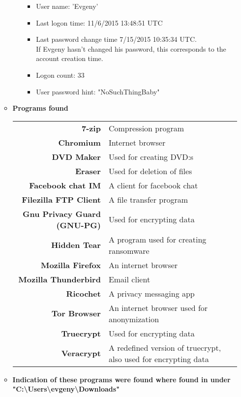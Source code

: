 \begin{enumerate}
\begin{itemize}
\begin{itemize}
		\begin{itemize}
			\item User name: 'Evgeny'
			\item Last logon time: 11/6/2015 13:48:51 UTC
			\item Last password change time 7/15/2015 10:35:34 UTC.\\
			If Evgeny hasn't changed his password, this corresponds to the account creation time.
			\item Logon count: 33
			\item User password hint: "NoSuchThingBaby"
		\end{itemize}
\end{itemize}
	
	
	\newpage
	\item \textbf{Programs found}
	
	\begin{tabular}{|r|l|}
		\hline
		\textbf{7-zip} & Compression program \\
		\textbf{Chromium} & Internet browser \\
		\textbf{DVD Maker} & Used for creating DVD:s \\
		\textbf{Eraser} & Used for deletion of files \\
		\textbf{Facebook chat IM} & A client for facebook chat \\
		\textbf{Filezilla FTP Client} & A file transfer program \\
		\textbf{Gnu Privacy Guard (GNU-PG)} & Used for encrypting data \\
		\textbf{Hidden Tear} & A program used for creating ransomware \\
		\textbf{Mozilla Firefox} & An internet browser \\
		\textbf{Mozilla Thunderbird} & Email client \\
		\textbf{Ricochet} & A privacy messaging app \\
		\textbf{Tor Browser} & An internet browser used for anonymization \\
		\textbf{Truecrypt} & Used for encrypting data \\
		\textbf{Veracrypt} & A redefined version of truecrypt, also used for encrypting data \\
		\hline
	\end{tabular}
	
	\item \textbf{Indication of these programs were found where found in under "C:\textbackslash Users\textbackslash evgeny\textbackslash Downloads"}
	

\end{itemize}
\end{enumerate}
